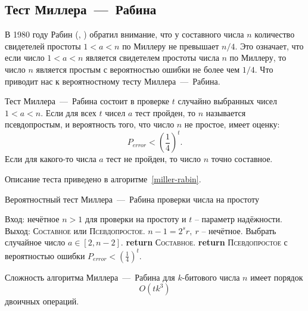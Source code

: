 \subsection{Тест Миллера~---~Рабина}\label{section-prime-check-miller-rabin}

В 1980 году Рабин (, \cite{Rabin:1980}) обратил внимание, что у составного числа $n$ количество свидетелей простоты $1 < a < n$ по Миллеру не превышает $n/4$. Это означает, что если число $1 < a < n$ является свидетелем простоты числа $n$ по Миллеру, то число $n$ является простым с вероятностью ошибки не более чем $1/4$. Что приводит нас к вероятностному тесту Миллера~---~Рабина.

Тест Миллера~---~Рабина состоит в проверке $t$ случайно выбранных чисел $1 < a < n$. Если для всех $t$ чисел $a$ тест пройден, то $n$ называется псевдопростым, и вероятность того, что число $n$ не простое, имеет оценку:
    \[ P_{error} < \left( \frac{1}{4} \right)^t. \]
Если для какого-то числа $a$ тест не пройден, то число $n$ точно составное.

Описание теста приведено в алгоритме~\ref{miller-rabin}.

\begin{algorithm}[ht] %
    \caption{Вероятностный тест Миллера~---~Рабина проверки числа на простоту\label{miller-rabin}}
    \begin{algorithmic}
        \STATE Вход: нечётное $n>1$ для проверки на простоту и $t$ -- параметр надёжности.
        \STATE Выход: \textsc{Составное} или \textsc{Псевдопростое}.
        \STATE $n - 1 = 2^s r, ~ r$ -- нечётное.
            \STATE Выбрать случайное число $a \in [2, n-2]$.
               \STATE \textbf{return} \textsc{Составное}.
           \ENDIF
        \ENDFOR
       \STATE \textbf{return} \textsc{Псевдопростое} с вероятностью ошибки $P_{error} < \left( \frac{1}{4} \right)^t$.
    \end{algorithmic}
\end{algorithm}

Сложность алгоритма Миллера~---~Рабина для $k$-битового числа $n$ имеет порядок
    \[ O(t k^3) \]
двоичных операций.

